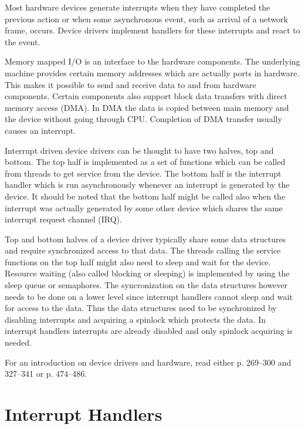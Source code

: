 \documentclass[twoside,a4paper]{report}
\begin{document}
Most hardware devices generate interrupts when they have completed the
previous action or when some asynchronous event, such as arrival of a
network frame, occurs. Device drivers implement handlers for these
interrupts and react to the event.

Memory mapped I/O is an interface to the hardware components. The
underlying machine provides certain memory addresses which are
actually ports in hardware. This makes it possible to send and receive
data to and from hardware components. Certain components also support
block data transfers with direct memory access (DMA). In DMA the data
is copied between main memory and the device without going through
CPU. Completion of DMA transfer usually causes an interrupt.

Interrupt driven device drivers can be thought to have two halves, top
and bottom. The top half is implemented as a set of functions which
can be called from threads to get service from the device. The bottom
half is the interrupt handler which is run asynchronously whenever an
interrupt is generated by the device. It should be noted that the
bottom half might be called also when the interrupt was actually
generated by some other device which shares the same interrupt request
channel (IRQ).

Top and bottom halves of a device driver typically share some data
structures and require synchronized access to that data. The threads
calling the service functions on the top half might also need to sleep
and wait for the device. Resource waiting (also called blocking or
sleeping) is implemented by using the sleep queue or semaphores. The
syncronization on the data structures however needs to be done on a
lower level since interrupt handlers cannot sleep and wait for access
to the data. Thus the data structures need to be synchronized by disabling
interrupts and acquiring a spinlock which protects the data. In
interrupt handlers interrupts are already disabled and only spinlock
acquiring is needed.

For an introduction on device drivers and hardware, read either
\cite{tanenbaum} p. 269--300 and 327--341 or \cite{stallings} p. 474--486.

\section{Interrupt Handlers}
\label{sec:inthandlers}
\end{document}
